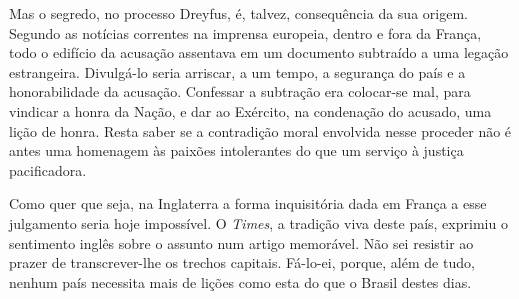Mas o segredo, no processo Dreyfus, é, talvez, consequência da sua
origem. Segundo as notícias correntes na imprensa europeia, dentro e
fora da França, todo o edifício da acusação assentava em um documento
subtraído a uma legação estrangeira. Divulgá-lo seria arriscar, a um
tempo, a segurança do país e a honorabilidade da acusação. Confessar a
subtração era colocar-se mal, para vindicar a honra da Nação, e dar
ao Exército, na condenação do acusado, uma lição de honra. Resta saber
se a contradição moral envolvida nesse proceder não é antes uma
homenagem às paixões intolerantes do que um serviço à justiça
pacificadora.

Como quer que seja, na Inglaterra a forma inquisitória dada em França a
esse julgamento seria hoje impossível. O \textit{Times}, a tradição 
viva deste país, exprimiu o sentimento inglês sobre o assunto num artigo
memorável. Não sei resistir ao prazer de transcrever-lhe os trechos
capitais. Fá-lo-ei, porque, além de tudo, nenhum país necessita
mais de lições como esta do que o Brasil destes dias.

